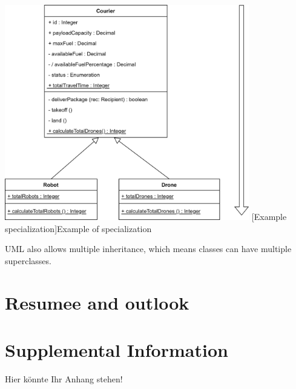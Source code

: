 \documentclass[
	12pt,
    a4paper,
    egregdoesnotlikesansseriftitles, %
    toc=chapterentrywithdots,
    oneside, openany,
    titlepage,
    parskip=half,
    headings=normal,  %
    listof=totoc,
    bibliography=totoc,
    index=totoc,
    captions=tableheading,  %
    listof=flat,
    numbers=noenddot, %
    final]
    {scrbook}
\begin{document}
\vspace{1em}
\begin{minipage}{\linewidth}
	\centering
	\includegraphics[width=0.8\textwidth]{figures/inheritance/specialization.jpg}
	[Example specialization]{Example of specialization}
	\label{fig:specialization}
\end{minipage}
\vspace{1em}


UML also allows multiple inheritance, which means classes can have multiple superclasses. \cite[p. 71] {seidl2015uml}

\chapter{Resumee and outlook}




\backmatter

\printnoidxglossaries


%

\clearpage %


\appendix
\chapter{Supplemental Information}\label{app:supplemental-information}
Hier könnte Ihr Anhang stehen!


\end{document}
